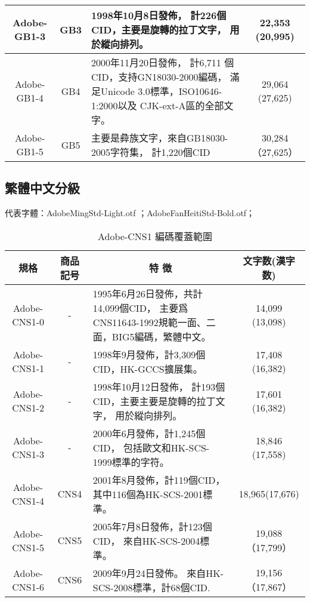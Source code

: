 \documentclass[a4,11pt,uplatex,openleft]{jsarticle}
\begin{document}
\begin{appendix}
\begin{table}[h]
{\begin{tabular}{|c|c|p{6cm}|c|}
Adobe-GB1-3	& GB3	&   1998年10月8日發佈，
計226個CID，主要是旋轉的拉丁文字，
用於縱向排列。 & 22,353 (20,995) \\

\hline
Adobe-GB1-4	& GB4 & 2000年11月20日發佈，
計6,711 個CID，支持GN18030-2000編碼，
滿足Unicode 3.0標準，ISO10646-1:2000以及 CJK-ext-A區的全部文字。
& 29,064 (27,625) \\
\hline
Adobe-GB1-5	& GB5 & 主要是彜族文字，來自GB18030-2005字符集，
計1,220個CID & 30,284（27,625） \\

\hline %
\end{tabular}
}
\end{table}

\clearpage
\subsection{繁體中文分級}
{\gtfamily 代表字體：AdobeMingStd-Light.otf ；AdobeFanHeitiStd-Bold.otf；}
\begin{table}[h]
\caption{\fontsize{12pt}{15pt}\selectfont Adobe-CNS1 編碼覆蓋範圍} %
\centering %
{\fontsize{10pt}{15}\selectfont\ttfamily
\begin{tabular}{|c|c|p{6cm}|c|}%
\hline  %

規格 & 商品記号	& \multicolumn{1}{|c|}{特 徴} & 文字数(漢字数) \\

\hline  %
Adobe-CNS1-0 &	-	 & 1995年6月26日發佈，共計14,099個CID，
主要爲CNS11643-1992規範一面、二面，BIG5編碼，繁體中文。
& 14,099 (13,098) \\
\hline
Adobe-CNS1-1	& - &	1998年9月發佈，計3,309個CID，HK-GCCS擴展集。
& 	17,408 (16,382) \\
\hline
Adobe-CNS1-2	& - &  1998年10月12日發佈，
計193個CID，主要主要是旋轉的拉丁文字，
用於縱向排列。 & 17,601 (16,382) \\
\hline

Adobe-CNS1-3	& -	&   2000年6月發佈，計1,245個CID，
包括歐文和HK-SCS-1999標準的字符。
&  18,846 (17,558) \\

\hline
Adobe-CNS1-4	& CNS4 & 2001年8月發佈，計119個CID，
其中116個為HK-SCS-2001標準。
& 18,965(17,676) \\
\hline
Adobe-CNS1-5	& CNS5 & 2005年7月8日發佈，計123個CID，
來自HK-SCS-2004標準。 & 19,088（17,799） \\
\hline
Adobe-CNS1-6	& CNS6 & 2009年9月24日發佈。
來自HK-SCS-2008標準，計68個CID. & 19,156（17,867） \\
\hline %
\end{tabular}
}
\end{table}

\end{appendix}
\end{document}
